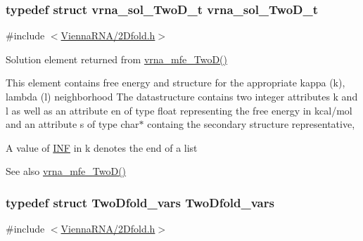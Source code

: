 \subsubsection[{vrna\+\_\+sol\+\_\+\+Two\+D\+\_\+t}]{\setlength{\rightskip}{0pt plus 5cm}typedef struct {\bf vrna\+\_\+sol\+\_\+\+Two\+D\+\_\+t}  {\bf vrna\+\_\+sol\+\_\+\+Two\+D\+\_\+t}}\label{group__kl__neighborhood__mfe_ga6a81a58268d250309712549a3fa0aab2}


{\ttfamily \#include $<$\hyperlink{2Dfold_8h}{Vienna\+R\+N\+A/2\+Dfold.\+h}$>$}



Solution element returned from \hyperlink{group__kl__neighborhood__mfe_ga243c288b463147352829df04de6a2f77}{vrna\+\_\+mfe\+\_\+\+Two\+D()} 

This element contains free energy and structure for the appropriate kappa (k), lambda (l) neighborhood The datastructure contains two integer attributes \textquotesingle{}k\textquotesingle{} and \textquotesingle{}l\textquotesingle{} as well as an attribute \textquotesingle{}en\textquotesingle{} of type float representing the free energy in kcal/mol and an attribute \textquotesingle{}s\textquotesingle{} of type char$\ast$ containg the secondary structure representative,

A value of \hyperlink{energy__const_8h_a12c2040f25d8e3a7b9e1c2024c618cb6}{I\+N\+F} in k denotes the end of a list

\begin{DoxySeeAlso}{See also}
\hyperlink{group__kl__neighborhood__mfe_ga243c288b463147352829df04de6a2f77}{vrna\+\_\+mfe\+\_\+\+Two\+D()} 
\end{DoxySeeAlso}
\hypertarget{group__kl__neighborhood__mfe_gaf4f514010a14f9d59d850742b3e96954}{}
\subsubsection[{Two\+Dfold\+\_\+vars}]{\setlength{\rightskip}{0pt plus 5cm}typedef struct {\bf Two\+Dfold\+\_\+vars}  {\bf Two\+Dfold\+\_\+vars}}\label{group__kl__neighborhood__mfe_gaf4f514010a14f9d59d850742b3e96954}


{\ttfamily \#include $<$\hyperlink{2Dfold_8h}{Vienna\+R\+N\+A/2\+Dfold.\+h}$>$}



